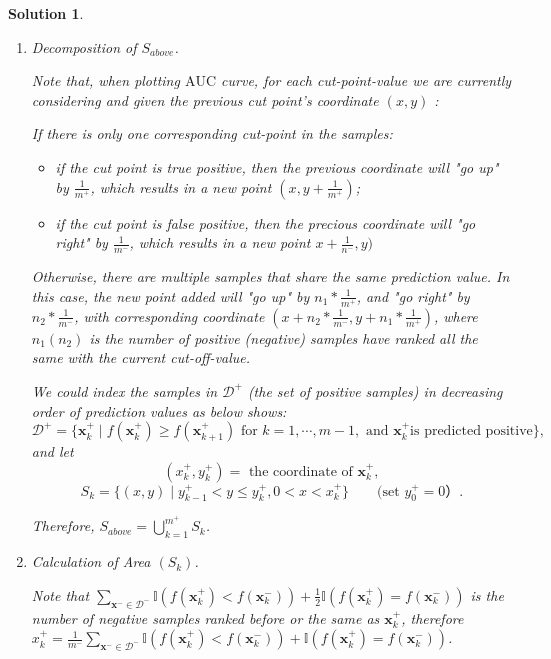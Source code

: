\documentclass[a4paper,UTF8]{article}
\numberwithin{equation}{section}
\newtheorem*{mySol}{Solution}
\begin{document}
\begin{mySol}
\begin{enumerate}[(1)]
\begin{figure}[!bh]
\end{figure}
\begin{enumerate}[Step 1.]
\item Decomposition of $S_{above}$.

Note that, when plotting $\mbox{AUC}$ curve, for each cut-point-value we are currently considering and given the previous cut point's coordinate $(x,y)$ :

 If there is only one corresponding cut-point in the samples:
 \begin{itemize}
\item if the cut point is true positive, then the previous coordinate will "go up" by $\frac{1}{m^+}$, which results in a new point $(x, y+\frac{1}{m^+})$;
\item  if the cut point is false positive, then the precious coordinate will "go right" by $\frac{1}{m^-}$, which results in a new point $x+\frac{1}{n^-}, y)$
\end{itemize}
Otherwise, there are multiple samples that share the same prediction value. In this case, the new point added will "go up" by $n_1*\frac{1}{m^+}$, and "go right" by $n_2 * \frac{1}{m^-}$, with corresponding coordinate $(x + n_2 * \frac{1}{m^-}, y + n_1*\frac{1}{m^+})$, where $n_1 ( n_2 )$ is the number of positive (negative) samples have  ranked all the same with the current cut-off-value.

We could index the samples in $\mathcal{D^+}$ (the set of positive samples) in decreasing order of prediction values as below shows:
 $$\mathcal{D^+} =\{\mathbf{x}^+_k \mid f(\mathbf{x}^+_k) \geq f(\mathbf{x}^+_{k+1}) \text{ for } k=1,\cdots, m-1, \text{ and } \mathbf{x}^+_k \text{is predicted positive}\}, $$
and let
$$(x^+_k, y^+_k)= \text{ the coordinate of }\mathbf{x}^+_k,$$ 
$$S_k =  \{(x,y) \mid y^+_{k-1} < y\leq y^+_k,0<x<x^+_k \} \quad \quad (\text{set }y^+_0=0）.$$  

Therefore,  $S_{above}= \bigcup_{k=1}^{m^+} S_{k}$.

\item Calculation of Area $(S_k)$.

Note that  $\sum_{\mathbf{x}^- \in \mathcal{D}^-} \mathbb{I}(f(\mathbf{x}^+_k)<f(\mathbf{x}^-_k)) + \frac{1}{2}\mathbb{I}(f(\mathbf{x}^+_k)=f(\mathbf{x}^-_k))$ is the number of negative samples ranked before or the same as $\mathbf{x}^+_k$, therefore $x^+_k = \frac{1}{m^-}\sum_{\mathbf{x}^- \in \mathcal{D}^-} \mathbb{I}(f(\mathbf{x}^+_k)<f(\mathbf{x}^-_k)) + \mathbb{I}(f(\mathbf{x}^+_k)=f(\mathbf{x}^-_k))$.



\end{enumerate}
\end{enumerate}
\end{mySol}
\end{document}
